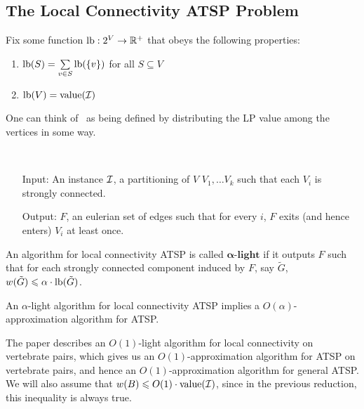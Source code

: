 \documentclass[./main.tex]{subfiles}
\begin{document}
	\subsection{The Local Connectivity ATSP Problem}
		Fix some function $\textup{lb} : 2^V\rightarrow \mathbb{R}^+$ that obeys the following properties:
		\begin{enumerate}
			\item $\textup{lb}(S) = \sum\limits_{v\in S}\textup{lb}(\{v\})$ for all $S\subseteq V$
			\item $\textup{lb}(V) = \textup{value}(\mathcal{I})$
		\end{enumerate}
		One can think of \lb\ as being defined by distributing the LP value among the vertices in some way.\\
		
		\begin{problem}\ 
			\begin{itemize}
				\item[Input:]
					An instance $\mathcal{I}$, a partitioning of $V$ $V_1, \dots V_k$ such that each $V_i$ is strongly connected.
				\item[Output:] $F$, an eulerian set of edges such that for every $i$, $F$ exits (and hence enters) $V_i$ at least once.\\
			\end{itemize}
		\end{problem}
		
		\begin{definition}
			An algorithm for local connectivity ATSP is called $\bm{\alpha}\textbf{-light}$ if it outputs $F$ such that for each strongly connected component induced by $F$, say $\tilde{G}$, $w(\tilde{G})\leqslant \alpha\cdot \textup{lb}(\tilde{G})$.\\
		\end{definition}
		
		\begin{theorem}[Svensson '15] 
			An $\alpha$-light algorithm for local connectivity ATSP implies a $O(\alpha)$-approximation algorithm for ATSP.
		\end{theorem}
		
		The paper describes an $O(1)$-light algorithm for local connectivity on vertebrate pairs, which gives us an $O(1)$-approximation algorithm for ATSP on vertebrate pairs, and hence an $O(1)$-approximation algorithm for general ATSP.\\
		We will also assume that $w(B)\leqslant O(1)\cdot \textup{value}(\mathcal{I})$, since in the previous reduction, this inequality is always true.\\
		
\end{document}
